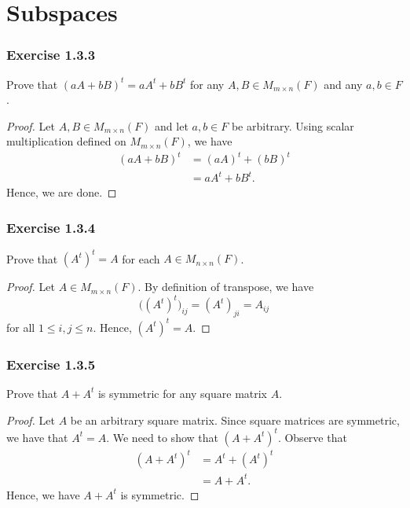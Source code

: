 \section{Subspaces}

\subsubsection{Exercise 1.3.3}

Prove that \( (aA + bB)^{t} = a A^{t} + b B^{t}  \) for any \( A,B \in M_{m \times n } (F) \) and any \( a,b \in F  \).

\begin{proof}
Let \( A , B \in M_{m \times n } (F ) \) and let \( a, b \in F  \) be arbitrary. Using scalar multiplication defined on \( M_{m \times n }(F ) \), we have 
\begin{align*}
    (aA + bB )^{t} &= (aA)^{t} + (bB)^{t}  \\
                   &= a A^{t} + b B^{t}.
\end{align*}
Hence, we are done.
\end{proof}

\subsubsection{Exercise 1.3.4} Prove that \( (A^{t})^{t} = A  \) for each \( A \in M_{n \times n}(F) \).
\begin{proof}
Let \( A \in M_{m \times n}(F) \). By definition of transpose, we have 
\[ \Big( (A^{t})^{t} \Big)_{ij} = (A^{t})_{ji} = A_{ij}   \]
for all \( 1 \leq i,j \leq n  \). Hence, \( (A^{t})^{t} = A  \).

\end{proof}



\subsubsection{Exercise 1.3.5} 
Prove that \( A + A^{t}  \) is symmetric for any square matrix \( A  \).

\begin{proof}
Let \( A  \) be an arbitrary square matrix. Since square matrices are symmetric, we have that \( A^{t} = A  \). We need to show that \( (A + A^{t})^{t}  \). Observe that 
\begin{align*}
    (A + A^{t})^{t} &= A^{t} + (A^{t})^{t} \\
                    &= A + A^{t}.
\end{align*}
Hence, we have \( A + A^{t}  \) is symmetric.
\end{proof}

